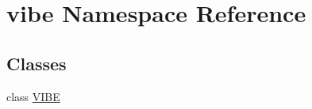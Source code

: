 \hypertarget{namespacevibe}{}\section{vibe Namespace Reference}
\label{namespacevibe}
\subsection*{Classes}
\begin{DoxyCompactItemize}
\item 
class \mbox{\hyperlink{classvibe_1_1_v_i_b_e}{V\+I\+BE}}
\end{DoxyCompactItemize}
